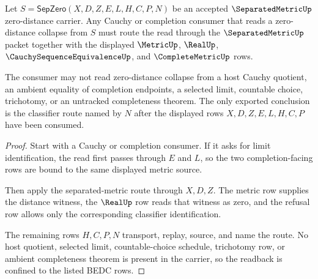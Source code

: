 \begin{theorem}
\label{thm:separated-metric-cauchy-completion-readback}
Let $S=\mathsf{SepZero}(X,D,Z,E,L,H,C,P,N)$ be an accepted $\SeparatedMetricUp$ zero-distance carrier. Any Cauchy or completion consumer that reads a zero-distance collapse from $S$ must route the read through the $\SeparatedMetricUp$ packet together with the displayed $\MetricUp$, $\RealUp$, $\CauchySequenceEquivalenceUp$, and $\CompleteMetricUp$ rows.

The consumer may not read zero-distance collapse from a host Cauchy quotient, an ambient equality of completion endpoints, a selected limit, countable choice, trichotomy, or an untracked completeness theorem. The only exported conclusion is the classifier route named by $N$ after the displayed rows $X,D,Z,E,L,H,C,P$ have been consumed.
\end{theorem}
\begin{proof}
Start with a Cauchy or completion consumer. If it asks for limit identification, the read first passes through $E$ and $L$, so the two completion-facing rows are bound to the same displayed metric source.

Then apply the separated-metric route through $X,D,Z$. The metric row supplies the distance witness, the $\RealUp$ row reads that witness as zero, and the refusal row allows only the corresponding classifier identification.

The remaining rows $H,C,P,N$ transport, replay, source, and name the route. No host quotient, selected limit, countable-choice schedule, trichotomy row, or ambient completeness theorem is present in the carrier, so the readback is confined to the listed BEDC rows.
\end{proof}

